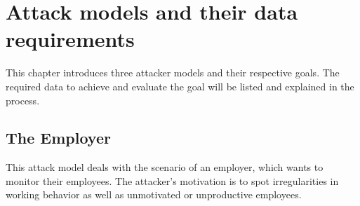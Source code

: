 \chapter{Attack models and their data requirements}\label{attack-models}
This chapter introduces three attacker models and their respective goals.
The required data to achieve and evaluate the goal will be listed and explained in the process.


\section{The Employer}
This attack model deals with the scenario of an employer, which wants to monitor their employees.
The attacker's motivation is to spot irregularities in working behavior as well as unmotivated or unproductive employees.

